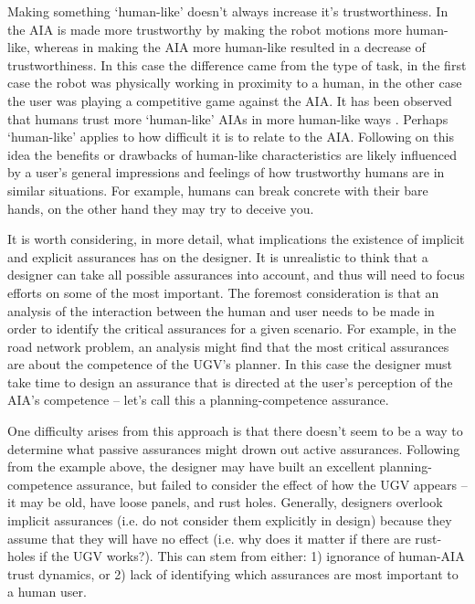     Making something `human-like' doesn't always increase it's trustworthiness. In \cite{Dragan2013-wd} the AIA is made more trustworthy by making the robot motions more human-like, whereas in \cite{Wu2016-ei} making the AIA more human-like resulted in a decrease of trustworthiness. In this case the difference came from the type of task, in the first case the robot was physically working in proximity to a human, in the other case the user was playing a competitive game against the AIA. It has been observed that humans trust more `human-like' AIAs in more human-like ways \citet{Tripp2011-rx}. Perhaps `human-like' applies to how difficult it is to relate to the AIA. Following on this idea the benefits or drawbacks of human-like characteristics are likely influenced by a user's general impressions and feelings of how trustworthy humans are in similar situations. For example, humans can break concrete with their bare hands, on the other hand they may try to deceive you. 

    It is worth considering, in more detail, what implications the existence of implicit and explicit assurances has on the designer. It is unrealistic to think that a designer can take all possible assurances into account, and thus will need to focus efforts on some of the most important. The foremost consideration is that an analysis of the interaction between the human and user needs to be made in order to identify the critical assurances for a given scenario. For example, in the road network problem, an analysis might find that the most critical assurances are about the competence of the UGV's planner. In this case the designer must take time to design an assurance that is directed at the user's perception of the AIA's competence -- let's call this a planning-competence assurance.

    One difficulty arises from this approach is that there doesn't seem to be a way to determine what passive assurances might drown out active assurances. Following from the example above, the designer may have built an excellent planning-competence assurance, but failed to consider the effect of how the UGV appears -- it may be old, have loose panels, and rust holes. Generally, designers overlook implicit assurances (i.e. do not consider them explicitly in design) because they assume that they will have no effect (i.e. why does it matter if there are rust-holes if the UGV works?). This can stem from either: 1) ignorance of human-AIA trust dynamics, or 2) lack of identifying which assurances are most important to a human user.

